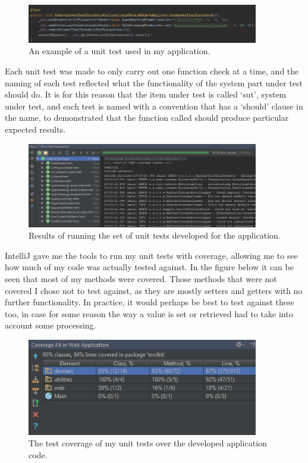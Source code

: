 \begin{figure}[H]
\centering
\includegraphics[width=0.9\textwidth]{images/unittestexample}
\caption{An example of a unit test used in my application.}
\end{figure}

Each unit test was made to only carry out one function check at a time, and the naming of each test reflected what the functionality of the system part under test should do. It is for this reason that the item under test is called `sut', system under test, and each test is named with a convention that has a `should' clause in the name, to demonstrated that the function called should produce particular expected results.

\begin{figure}[H]
\centering
\includegraphics[width=0.9\textwidth]{images/unittestsuccess}
\caption{Results of running the set of unit tests developed for the application.}
\end{figure}

IntelliJ gave  me the tools to run my unit tests with coverage, allowing me to see how much of my code was actually tested against. In the figure below it can be seen that most of my methods were covered. Those methods that were not covered I chose not to test against, as they are mostly setters and getters with no further functionality. In practice, it would perhaps be best to test against these too, in case for some reason the way a value is set or retrieved had to take into account some processing.

\begin{figure}[H]
\centering
\includegraphics[width=0.9\textwidth]{images/testcoverage1}
\caption{The test coverage of my unit tests over the developed application code.}
\end{figure}

